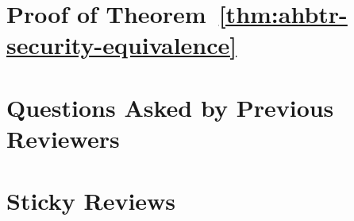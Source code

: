 \documentclass[
  layout=6x9,
  envelope-icons=no,
  format=lncs-submission-draft
]{crypto-paper}
\begin{document}




\LaomianBody















\LaomianAcknowledgments


\LaomianAppendix

% 

\section{Proof of Theorem~\ref{thm:ahbtr-security-equivalence}}
\label{sec:deferred}



\section{Questions Asked by Previous Reviewers}
\label{sec:faq}



\section{Sticky Reviews}
\label{sec:sticky-reviews}


\end{document}
